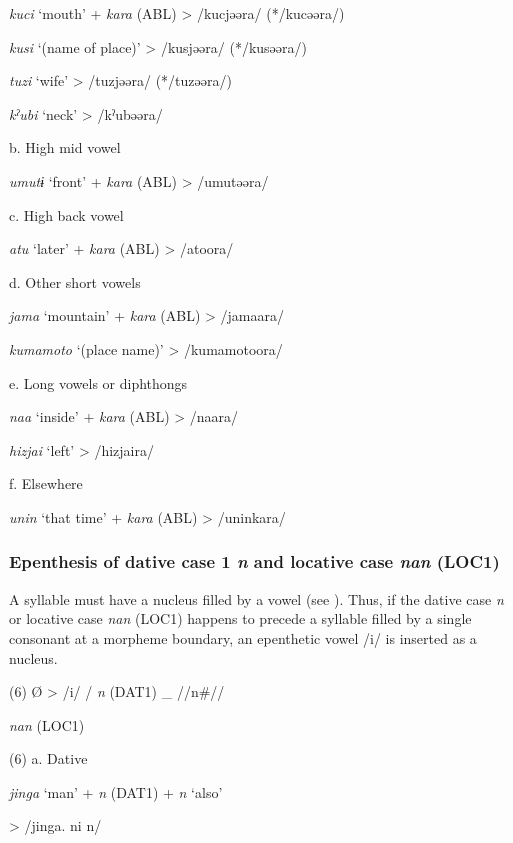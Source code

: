     \textit{kuci}  ‘mouth’  +  \textit{kara} (ABL)  >  /kucjəəra/  (*/kucəəra/)

    \textit{kusi}  ‘(name of place)’      >  /kusjəəra/  (*/kusəəra/)

    \textit{tuzi}  ‘wife’      >  /tuzjəəra/  (*/tuzəəra/)

    \textit{kˀubi}  ‘neck’      >  /kˀubəəra/  

  b.  High mid vowel

    \textit{umutɨ}  ‘front’  +  \textit{kara} (ABL)  >  /umutəəra/  

  c.  High back vowel  

    \textit{atu}  ‘later’  +  \textit{kara} (ABL)  >  /atoora/  

  d.  Other short vowels

    \textit{jama}  ‘mountain’  +  \textit{kara} (ABL)  >  /jamaara/  

    \textit{kumamoto}  ‘(place name)’      >  /kumamotoora/  

  e.  Long vowels or diphthongs  

    \textit{naa}  ‘inside’  +  \textit{kara} (ABL)  >  /naara/  

    \textit{hizjai}  ‘left’      >  /hizjaira/  

  f.  Elsewhere

    \textit{unin}  ‘that time’  +  \textit{kara} (ABL)  >  /uninkara/  

\subsubsection{Epenthesis of dative case 1 \textit{n} and locative case \textit{nan} (LOC1)}

A syllable must have a nucleus filled by a vowel (see ). Thus, if the dative case \textit{n} or locative case \textit{nan} (LOC1) happens to precede a syllable filled by a single consonant at a morpheme boundary, an epenthetic vowel /i/ is inserted as a nucleus.

(6)  Ø  >  /i/  /  %
  \textit{n}  %
(DAT1)    \_  //n\#//

            \textit{nan}  (LOC1)      

(6)  a.  Dative

    \textit{jinga}  ‘man’  +  \textit{n}  (DAT1)  +  \textit{n}  ‘also’

  >  /jinga.      ni      n/  

